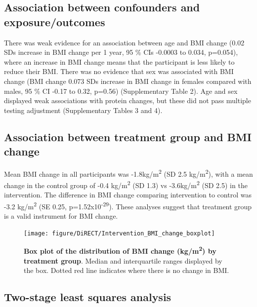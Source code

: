 \documentclass[11pt,twoside]{bristolthesis}
\begin{document}
\hypertarget{association-between-confounders-and-exposureoutcomes}{%
\subsection{Association between confounders and exposure/outcomes}\label{association-between-confounders-and-exposureoutcomes}}

There was weak evidence for an association between age and BMI change (0.02 SDs increase in BMI change per 1 year, 95 \% CIs -0.0003 to 0.034, p=0.054), where an increase in BMI change means that the participant is less likely to reduce their BMI. There was no evidence that sex was associated with BMI change (BMI change 0.073 SDs increase in BMI change in females compared with males, 95 \% CI -0.17 to 0.32, p=0.56) (Supplementary Table 2). Age and sex displayed weak associations with protein changes, but these did not pass multiple testing adjustment (Supplementary Tables 3 and 4).

\hypertarget{association-between-treatment-group-and-bmi-change}{%
\subsection{Association between treatment group and BMI change}\label{association-between-treatment-group-and-bmi-change}}

Mean BMI change in all participants was -1.8kg/m\textsuperscript{2} (SD 2.5 kg/m\textsuperscript{2}), with a mean change in the control group of -0.4 kg/m\textsuperscript{2} (SD 1.3) vs -3.6kg/m\textsuperscript{2} (SD 2.5) in the intervention. The difference in BMI change comparing intervention to control was -3.2 kg/m\textsuperscript{2} (SE 0.25, p=1.52x10\textsuperscript{-29}). These analyses suggest that treatment group is a valid instrument for BMI change.



\begin{figure}
\texttt{[image: figure/DiRECT/Intervention\_BMI\_change\_boxplot]} \caption[Box plot of the distribution of BMI change (kg/m\textsuperscript{2}) by treatment group]{\textbf{Box plot of the distribution of BMI change (kg/m\textsuperscript{2}) by treatment group}. Median and interquartile ranges displayed by the box. Dotted red line indicates where there is no change in BMI.}\label{fig:box-BMI-change}
\end{figure}
\hypertarget{two-stage-least-squares-analysis}{%
\subsection{Two-stage least squares analysis}\label{two-stage-least-squares-analysis}}
\end{document}
